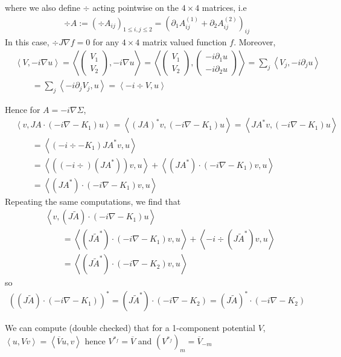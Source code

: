 \documentclass[11pt,a4paper,reqno,french,tikz]{amsart}
\newcommand{\pa}[1]{\left( #1 \right)} %
\newcommand{\ps}[1]{\left< #1 \right>} %
\newcommand{\na}{\nabla} %
\newcommand{\mat}[1]{\begin{pmatrix} #1 \end{pmatrix}} %
\begin{document}
where we also define $\div$ acting pointwise on the $4\times 4$ matrices, i.e
\begin{align*}
\div A := \pa{\div A_{ij}}_{1 \le i,j \le 2} = \pa{\partial_1 A^{(1)}_{ij} + \partial_2 A^{(2)}_{ij}}_{ij}
\end{align*}
In this case, $\div J \na f = 0$ for any $4 \times 4$ matrix valued function $f$. Moreover,
\begin{align*}
	& \ps{V, -i\na u} = \ps{\mat{V_1 \\ V_2}, -i\na u} = \ps{\mat{V_1 \\ V_2}, \mat{-i\partial_1 u \\ -i\partial_2 u}} =\sum_j  \ps{V_j,-i\partial_j u} \\
&\qquad = \sum_j \ps{-i\partial_j V_j,u} = \ps{-i\div V, u}
\end{align*}

Hence for $A = -i\na \Sigma$,
\begin{align*}
	&\ps{v, JA \cdot \pa{-i\na -K_1} u} = \ps{\pa{JA}^* v, \pa{-i\na -K_1}u} = \ps{JA^* v, \pa{-i\na -K_1}u} \\
	& \qquad =  \ps{\pa{-i\div -K_1}JA^* v, u} \\
	& \qquad = \ps{ \pa{\pa{-i\div }\pa{JA^*}}v , u} + \ps{(JA^*) \cdot \pa{-i\na -K_1}v , u} \\
	& \qquad = \ps{(JA^*) \cdot\pa{-i\na -K_1}v , u}
\end{align*}
Repeating the same computations, we find that
\begin{align*}
& \ps{v, \pa{J \widetilde{A}} \cdot \pa{-i\na -K_1} u} \\
& \qquad = \ps{\pa{J \widetilde{A}^*} \cdot \pa{-i\na -K_1} v,u} + \ps{-i\div \pa{J \widetilde{A}^*} v,u} \\
& \qquad = \ps{\pa{J \widetilde{A}^*} \cdot \pa{-i\na -K_2} v,u}
\end{align*}
so 
\begin{align*}
\pa{\pa{J \widetilde{A}} \cdot \pa{-i\na -K_1}}^* = \pa{J \widetilde{A}^*} \cdot \pa{-i\na -K_2} = \pa{J \widetilde{A}}^* \cdot \pa{-i\na -K_2}
\end{align*}

We can compute (double checked) that for a 1-component potential $V$, $\ps{u, V v} = \ps{\overline{V} u,v}$ hence $V^{*_f} = \overline{V}$ and $\pa{V^{*_f}}_m = \overline{V}_{-m}$
\end{document}

